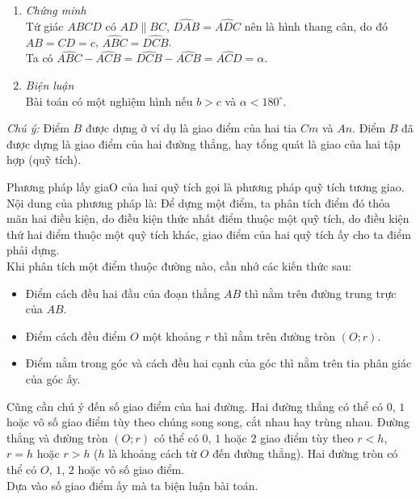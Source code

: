 \begin{vd}
{\begin{enumerate}
		\item \textit{Chứng minh}\\
		Tứ giác $ABCD$ có $AD\parallel BC$, $\widehat{DAB}=\widehat{ADC}$ nên là hình thang cân, do đó $AB=CD=c$, $\widehat{ABC}=\widehat{DCB}$.\\
		Ta có $\widehat{ABC}-\widehat{ACB}=\widehat{DCB}-\widehat{ACB}=\widehat{ACD}=\alpha$.
		\item \textit{Biện luận}\\
		Bài toán có một nghiệm hình nếu $b>c$ và $\alpha<180^\circ$.
	\end{enumerate}
	\textit{Chú ý:} Điểm $B$ được dựng ở ví dụ là giao điểm của hai tia $Cm$ và $An$. Điểm $B$ đã được dựng là giao điểm của hai đường thẳng, hay tổng quát là giao của hai tập hợp (quỹ tích).

}
\end{vd}
Phương pháp lấy giaO của hai quỹ tích gọi là phương pháp quỹ tích tương giao. Nội dung của phương pháp là: Để dựng một điểm, ta phân tích điểm đó thỏa mãn hai điều kiện, do điều kiện thức nhất điểm thuộc một quỹ tích, do điều kiện thứ hai điểm thuộc một quỹ tích khác, giao điểm của hai quỹ tích ấy cho ta điểm phải dựng.\\
Khi phân tích một điểm thuộc đường nào, cần nhớ các kiến thức sau:
\begin{itemize}
	\item Điểm cách đều hai đầu của đoạn thẳng $AB$ thì nằm trên đường trung trực của $AB$.
	\item Điểm cách đều điểm $O$ một khoảng $r$ thì nằm trên đường tròn $(O;r)$.
	\item Điểm nằm trong góc và cách đều hai cạnh của góc thì nằm trên tia phân giác của góc ấy.
\end{itemize}
Cũng cần chú ý đến số giao điểm của hai đường. Hai đường thẳng có thể có $0$, $1$ hoặc vô số giao điểm tùy theo chúng song song, cắt nhau hay trùng nhau. Đường thẳng và đường tròn $(O;r)$ có thể có $0$, $1$ hoặc $2$ giao điểm tùy theo $r<h$, $r=h$ hoặc $r>h$ ($h$ là khoảng cách từ $O$ đến đường thẳng). Hai đường tròn có thể có $O$, $1$, $2$ hoặc vô số giao điểm.\\
Dựa vào số giao điểm ấy mà ta biện luận bài toán.
